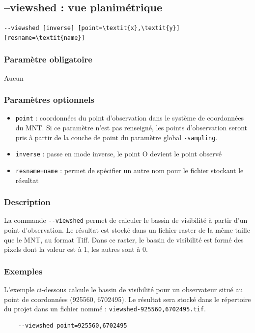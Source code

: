 \documentclass{report}
\begin{document}
\subsection{--viewshed : vue planimétrique}
\begin{Verbatim}[commandchars=\\\{\}]
--viewshed [inverse] [point=\textit{x},\textit{y}] [resname=\textit{name}]
\end{Verbatim}

\subsubsection{Paramètre obligatoire}
Aucun

\subsubsection{Paramètres optionnels}
\begin{itemize}
	\item \verb|point| : coordonnées du point d'observation dans le système de coordonnées du MNT. Si ce paramètre n'est pas renseigné, les points d'observation seront pris à partir de la couche de point du paramètre global \verb|-sampling|.
	\item \verb|inverse| : passe en mode inverse, le point O devient le point observé
	\item \verb|resname=name| : permet de spécifier un autre nom pour le fichier stockant le résultat
\end{itemize}

\subsubsection{Description}
La commande \verb|--viewshed| permet de calculer le bassin de visibilité à partir d'un point d'observation. Le résultat est stocké dans un fichier raster de la même taille que le MNT, au format Tiff. Dans ce raster, le bassin de visibilité est formé des pixels dont la valeur est à 1, les autres sont à 0.

\subsubsection{Exemples}
L'exemple ci-dessous calcule le bassin de visibilité pour un observateur situé au point de coordonnées (925560, 6702495). Le résultat sera stocké dans le répertoire du projet dans un fichier nommé : \verb|viewshed-925560,6702495.tif|.
\begin{Verbatim}
	--viewshed point=925560,6702495
\end{Verbatim}
\end{document}
